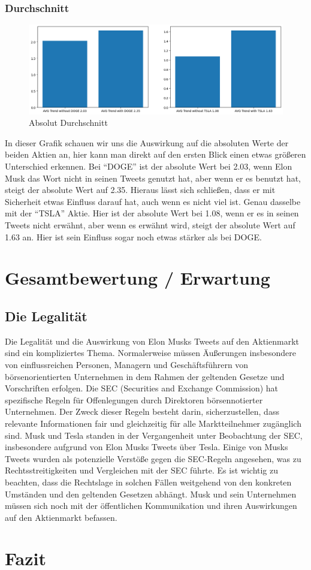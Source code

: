 \documentclass{article}
\begin{document}
\subsubsection{Durchschnitt}
\begin{figure}[!htb]
  	\includegraphics[width=\textwidth, center]{../imgs/Absolut_Durchschnitt.png}
 	\caption{Absolut Durchschnitt}
 	\label{fig:Absolut Durchschnitt}
\end{figure}
In dieser Grafik schauen wir uns die Auswirkung auf die absoluten Werte der beiden Aktien an, hier kann man direkt auf den ersten Blick einen etwas größeren Unterschied erkennen.
Bei ``DOGE'' ist der absolute Wert bei 2.03, wenn Elon Musk das Wort nicht in seinen Tweets genutzt hat, aber wenn er es benutzt hat, steigt der absolute Wert auf 2.35. Hieraus lässt sich schließen, dass er mit Sicherheit etwas Einfluss darauf hat, auch wenn es nicht viel ist.
Genau dasselbe mit der ``TSLA'' Aktie. Hier ist der absolute Wert bei 1.08, wenn er es in seinen Tweets nicht erwähnt, aber wenn es erwähnt wird, steigt der absolute Wert auf 1.63 an. Hier ist sein Einfluss sogar noch etwas stärker als bei DOGE.




\section{Gesamtbewertung / Erwartung}

\subsection{Die Legalität}
Die Legalität und die Auswirkung von Elon Musks Tweets auf den Aktienmarkt sind ein kompliziertes
Thema. Normalerweise müssen Äußerungen insbesondere von einflussreichen Personen, Managern
und Geschäftsführern von börsenorientierten Unternehmen in dem Rahmen der geltenden Gesetze
und Vorschriften erfolgen.
Die SEC (Securities and Exchange Commission) hat spezifische Regeln für Offenlegungen durch
Direktoren börsennotierter Unternehmen. Der Zweck dieser Regeln besteht darin, sicherzustellen,
dass relevante Informationen fair und gleichzeitig für alle Marktteilnehmer zugänglich sind. Musk und
Tesla standen in der Vergangenheit unter Beobachtung der SEC, insbesondere aufgrund von Elon
Musks Tweets über Tesla. Einige von Musks Tweets wurden als potenzielle Verstöße gegen die SEC-Regeln angesehen, was zu Rechtsstreitigkeiten und Vergleichen mit der SEC führte. Es ist wichtig zu beachten, dass die Rechtslage in solchen Fällen weitgehend von den konkreten Umständen und den
geltenden Gesetzen abhängt. Musk und sein Unternehmen müssen sich noch mit der öffentlichen
Kommunikation und ihren Auswirkungen auf den Aktienmarkt befassen.

\section{Fazit}
\end{document}
